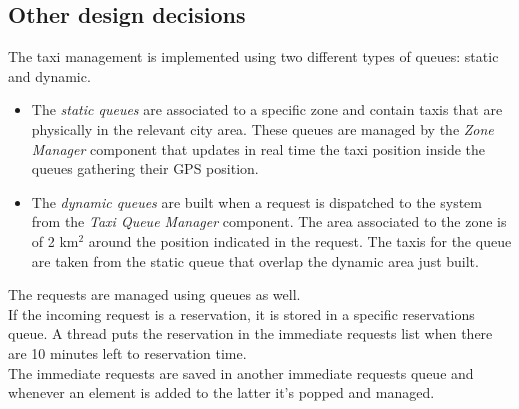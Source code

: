 \subsection{Other design decisions}
The taxi management is implemented using two different types of queues: static and dynamic.
\begin{itemize}
\item The \textit{static queues} are associated to a specific zone and contain taxis that are physically in the relevant city area. These queues are managed by the \textit{Zone Manager} component that updates in real time the taxi position inside the queues gathering their GPS position.
\item The \textit{dynamic queues} are built when a request is dispatched to the system from the \textit{Taxi Queue Manager} component. The area associated to the zone is of 2 km$^2$ around the position indicated in the request. The taxis for the queue are taken from the static queue that overlap the dynamic area just built.
\end{itemize}
The requests are managed using queues as well.\\
If the incoming request is a reservation, it is stored in a specific reservations queue. A thread puts the reservation in the immediate requests list when there are 10 minutes left to reservation time.\\
The immediate requests are saved in another immediate requests queue and whenever an element is added to the latter it's popped and managed.